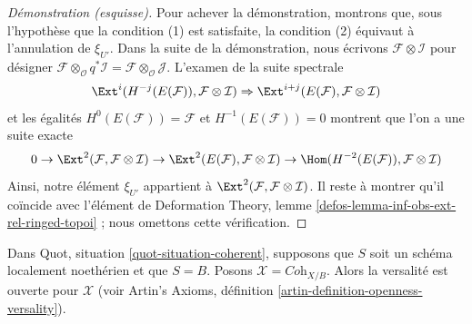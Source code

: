 \begin{proof}[Démonstration (esquisse)]
\medskip\noindent
Pour achever la démonstration, montrons que, sous l'hypothèse que la condition
(1) est satisfaite, la condition (2) équivaut à l'annulation de $\xi_{U'}$.
Dans la suite de la démonstration, nous écrivons
$\mathcal{F} \otimes \mathcal{I}$ pour désigner
$\mathcal{F} \otimes_\mathcal{O} q^*\mathcal{I} =
\mathcal{F} \otimes_\mathcal{O} \mathcal{J}$. L'examen de la suite spectrale
$$
\Ext^i(H^{-j}(E(\mathcal{F})), \mathcal{F} \otimes \mathcal{I})
\Rightarrow
\Ext^{i + j}(E(\mathcal{F}), \mathcal{F} \otimes \mathcal{I})
$$
et les égalités $H^0(E(\mathcal{F})) = \mathcal{F}$ et
$H^{-1}(E(\mathcal{F})) = 0$ montrent que l'on a une suite exacte
$$
0 \to
\Ext^2(\mathcal{F}, \mathcal{F} \otimes \mathcal{I}) \to
\Ext^2(E(\mathcal{F}), \mathcal{F} \otimes \mathcal{I}) \to
\Hom(H^{-2}(E(\mathcal{F})), \mathcal{F} \otimes \mathcal{I})
$$
Ainsi, notre élément $\xi_{U'}$ appartient à
$\Ext^2(\mathcal{F}, \mathcal{F} \otimes \mathcal{I})$.
Il reste à montrer qu'il coïncide avec l'élément de
Deformation Theory, lemme \ref{defos-lemma-inf-obs-ext-rel-ringed-topoi} ;
nous omettons cette vérification.
\end{proof}

\begin{lemma}
\label{lemma-coherent-defo-thy-general}
Dans Quot, situation \ref{quot-situation-coherent}, supposons que $S$ soit un
schéma localement noethérien et que $S = B$. Posons
$\mathcal{X} = \textit{Coh}_{X/B}$. Alors la versalité est ouverte pour
$\mathcal{X}$ (voir Artin's Axioms, définition
\ref{artin-definition-openness-versality}).
\end{lemma}

